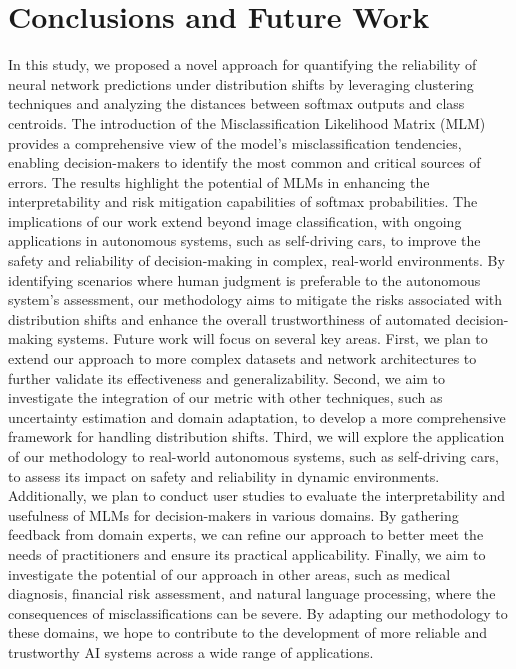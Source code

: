 
\section{Conclusions and Future Work}

In this study, we proposed a novel approach for quantifying the reliability of neural network predictions under distribution shifts by leveraging clustering techniques and analyzing the distances between softmax outputs and class centroids. The introduction of the Misclassification Likelihood Matrix (MLM) provides a comprehensive view of the model's misclassification tendencies, enabling decision-makers to identify the most common and critical sources of errors.
The results highlight the potential of MLMs in enhancing the interpretability and risk mitigation capabilities of softmax probabilities.
The implications of our work extend beyond image classification, with ongoing applications in autonomous systems, such as self-driving cars, to improve the safety and reliability of decision-making in complex, real-world environments. By identifying scenarios where human judgment is preferable to the autonomous system's assessment, our methodology aims to mitigate the risks associated with distribution shifts and enhance the overall trustworthiness of automated decision-making systems.
Future work will focus on several key areas. First, we plan to extend our approach to more complex datasets and network architectures to further validate its effectiveness and generalizability. Second, we aim to investigate the integration of our metric with other techniques, such as uncertainty estimation and domain adaptation, to develop a more comprehensive framework for handling distribution shifts. Third, we will explore the application of our methodology to real-world autonomous systems, such as self-driving cars, to assess its impact on safety and reliability in dynamic environments.
Additionally, we plan to conduct user studies to evaluate the interpretability and usefulness of MLMs for decision-makers in various domains. By gathering feedback from domain experts, we can refine our approach to better meet the needs of practitioners and ensure its practical applicability.
Finally, we aim to investigate the potential of our approach in other areas, such as medical diagnosis, financial risk assessment, and natural language processing, where the consequences of misclassifications can be severe. By adapting our methodology to these domains, we hope to contribute to the development of more reliable and trustworthy AI systems across a wide range of applications.